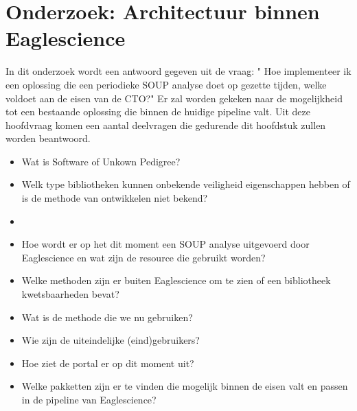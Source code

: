 
\chapter{Onderzoek: Architectuur binnen Eaglescience} %

\label{OnderzoekArchituur} %

In dit onderzoek wordt een antwoord gegeven uit de vraag: " Hoe implementeer ik een oplossing die een periodieke SOUP analyse doet op gezette tijden, welke voldoet aan de eisen van de CTO?" Er zal worden gekeken naar de mogelijkheid tot een bestaande oplossing die binnen de huidige pipeline valt. Uit deze hoofdvraag komen een aantal deelvragen die gedurende dit hoofdstuk zullen worden beantwoord.

\begin{itemize}

\begin{itemize}




\item Welke methoden zijn er buiten Eaglescience om te zien of een bibliotheek kwetsbaarheden bevat?


\item Wie zijn de uiteindelijke (eind)gebruikers van de module?

\item Welke pakketten zijn er te vinden die mogelijk binnen de eisen valt en passen in de pipeline van Eaglescience?
\item Waaruit bestaat de huidige pipeline?
\item Hoe gaat Eaglescience te werk, wat is het process dat gevolgd wordt?
\item Hoe relateert de pipeline zich tot het process binnen Eaglescience.
\end{itemize}

\item Wat is Software of Unkown Pedigree?
\item Welk type bibliotheken kunnen onbekende veiligheid eigenschappen hebben of is de methode van ontwikkelen niet bekend?

\item
\item Hoe wordt er op het dit moment een SOUP analyse uitgevoerd door Eaglescience en wat zijn de resource die gebruikt worden?
\item Welke methoden zijn er buiten Eaglescience om te zien of een bibliotheek kwetsbaarheden bevat?
\item Wat is de methode die we nu gebruiken?
\item Wie zijn de uiteindelijke (eind)gebruikers?
\item Hoe ziet de portal er op dit moment uit?
\item Welke pakketten zijn er te vinden die mogelijk binnen de eisen valt en passen in de pipeline van Eaglescience?
\end{itemize}


